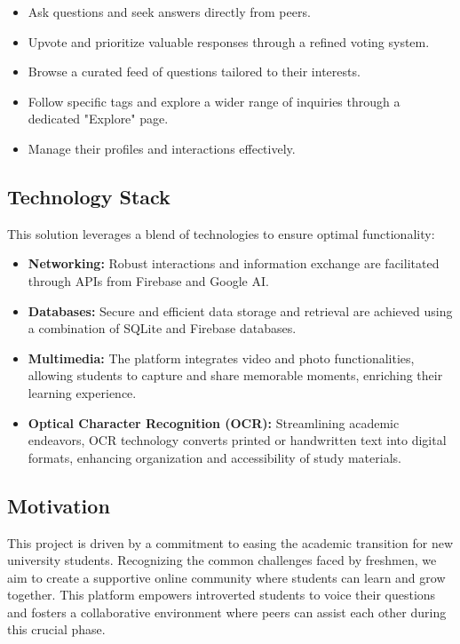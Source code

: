 \begin{itemize}
  \item Ask questions and seek answers directly from peers.
  \item Upvote and prioritize valuable responses through a refined voting system.
  \item Browse a curated feed of questions tailored to their interests.
  \item Follow specific tags and explore a wider range of inquiries through a dedicated "Explore" page.
  \item Manage their profiles and interactions effectively.
\end{itemize}

\subsection{Technology Stack}

This solution leverages a blend of technologies to ensure optimal functionality:

\begin{itemize}
  \item \textbf{Networking:} Robust interactions and information exchange are facilitated through APIs from Firebase and Google AI.
  \item \textbf{Databases:} Secure and efficient data storage and retrieval are achieved using a combination of SQLite and Firebase databases.
  \item \textbf{Multimedia:} The platform integrates video and photo functionalities, allowing students to capture and share memorable moments, enriching their learning experience.
  \item \textbf{Optical Character Recognition (OCR):} Streamlining academic endeavors, OCR technology converts printed or handwritten text into digital formats, enhancing organization and accessibility of study materials.
\end{itemize}

\subsection{Motivation}

This project is driven by a commitment to easing the academic transition for new university students. Recognizing the common challenges faced by freshmen, we aim to create a supportive online community where students can learn and grow together. This platform empowers introverted students to voice their questions and fosters a collaborative environment where peers can assist each other during this crucial phase.





